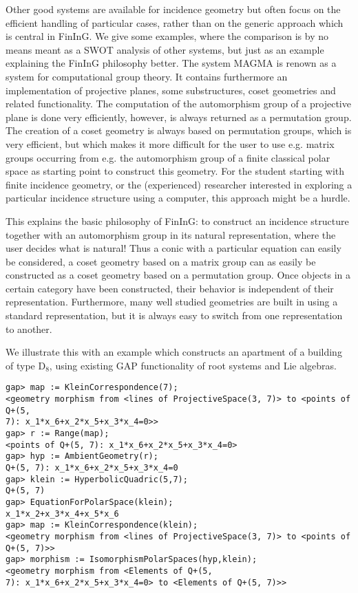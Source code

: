 \documentclass{article}
\def\fining{{\sf FinInG}}
\begin{document}
Other good systems are available for incidence geometry but often focus on the efficient handling of particular cases, rather than on the generic approach which is central in \fining.
We give some examples, where the comparison is by no means meant as a SWOT analysis of other systems, but just as an example
explaining the \fining{} philosophy better. The system {\sf MAGMA} \cite{magma} is renown as a system for computational group theory. It contains
furthermore an implementation of projective planes, some substructures, coset geometries and related functionality. The computation
of the automorphism group of a projective plane is done very efficiently, however, is always returned as a permutation group. The creation
of a coset geometry is always based on permutation groups, which is very efficient, but which makes it more difficult for the user to 
use e.g. matrix groups occurring from e.g. the automorphism group of a finite classical polar space as starting point to construct this geometry. For the student starting with finite incidence geometry, or the (experienced) researcher interested
in exploring a particular incidence structure using a computer, this approach might be a hurdle. 

This explains the basic philosophy of \fining{}: to construct an incidence structure together with an automorphism group 
in its natural representation, where the user decides what is natural! Thus a conic with a particular equation can easily be considered,
a coset geometry based on a matrix group can as easily be constructed as a coset geometry based on a permutation group. Once objects
in a certain category have been constructed, their behavior is independent of their representation. Furthermore, many well studied
geometries are built in using a standard representation, but it is always easy to switch from one representation to another.

We illustrate this with an example which constructs an apartment of a building of type $\mathrm{D}_8$, using existing GAP functionality of root systems and Lie algebras.
\begin{verbatim}
gap> map := KleinCorrespondence(7);
<geometry morphism from <lines of ProjectiveSpace(3, 7)> to <points of Q+(5, 
7): x_1*x_6+x_2*x_5+x_3*x_4=0>>
gap> r := Range(map);
<points of Q+(5, 7): x_1*x_6+x_2*x_5+x_3*x_4=0>
gap> hyp := AmbientGeometry(r);
Q+(5, 7): x_1*x_6+x_2*x_5+x_3*x_4=0
gap> klein := HyperbolicQuadric(5,7);
Q+(5, 7)
gap> EquationForPolarSpace(klein);
x_1*x_2+x_3*x_4+x_5*x_6
gap> map := KleinCorrespondence(klein);
<geometry morphism from <lines of ProjectiveSpace(3, 7)> to <points of Q+(5, 7)>>
gap> morphism := IsomorphismPolarSpaces(hyp,klein);
<geometry morphism from <Elements of Q+(5, 
7): x_1*x_6+x_2*x_5+x_3*x_4=0> to <Elements of Q+(5, 7)>>
\end{verbatim}
\end{document}
